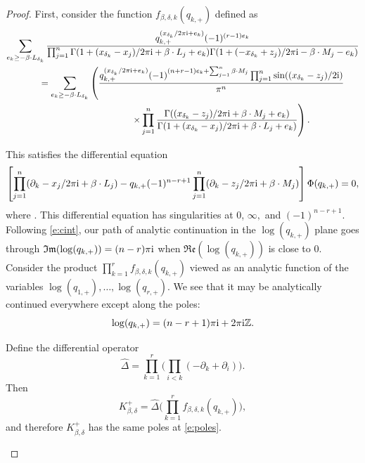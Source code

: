 \documentclass[pdftex]{sigma}
\numberwithin{equation}{section}
\newcommand{\ZZ}{\mathbb{Z}}
\newcommand{\MB}{M}
\newcommand{\LB}{L}
\newcommand{\z}{z}
\newcommand{\x}{x}
\begin{document}
\begin{proof}


First, consider the function $f_{\beta, \delta, k}(q_{k, +})$ defined as
\begin{gather*}
\sum_{e_k \geq - \beta \cdot \LB_{\delta_k}}
\frac{q_{k, +}^{( \x_{\delta_k}/2\pi {\rm i} + e_k)} (-1)^{(r-1)e_k}}{
\prod_{j=1}^n\Gamma(1+(\x_{\delta_k}-\x_j)/2 \pi {\rm i}+\beta\cdot \LB_j+e_k)\Gamma(1+(-\x_{\delta_k}+\z_j)/2 \pi {\rm i}-\beta\cdot \MB_j-e_k)} \\
\qquad{}=\sum_{e_k \geq - \beta \cdot \LB_{\delta_k}}
\left( \frac{q_{k, +}^{( \x_{\delta_k}/2\pi {\rm i} + e_k)}(-1)^{(n+r-1)e_k + \sum_{j=1}^n \beta \cdot M_j }\prod_{j=1}^n \sin((\x_{\delta_k}-\z_j)/2{\rm i})
 }{ \pi^n
} \right. \\
\qquad\quad\hphantom{=\sum_{e_k \geq - \beta \cdot \LB_{\delta_k}}}{} \left.\times \prod_{j=1}^n\frac{\Gamma((\x_{\delta_k}-\z_j)/2 \pi {\rm i}+\beta\cdot \MB_j+e_k)}{\Gamma(1+(\x_{\delta_k}-\x_j)/2 \pi {\rm i}+\beta\cdot \LB_j+e_k)}\right).
\end{gather*}

This satisfies the differential equation
\[
\left[\prod_{j=1}^n (\partial_k -x_j/2 \pi {\rm i} + \beta \cdot L_j) - q_{k, +}(-1)^{n-r+1}\prod_{j=1}^n (\partial_k -z_j/2 \pi {\rm i} + \beta \cdot M_j) \right] \Phi(q_{k,+}) = 0,
\]
where . This differential equation has singularities at $0$, $\infty,$ and $(-1)^{n-r+1}$. Follo\-wing \eqref{e:cint}, our path of analytic continuation in the $\log(q_{k,+})$ plane goes through $\mathfrak{Im}(\log(q_{k,+})) = (n-r)\pi {\rm i}$ when $\mathfrak{Re}(\log(q_{k,+}))$ is close to 0.
Consider the product
$
\prod_{k=1}^r   f_{\beta, \delta, k}(q_{k, +})$
viewed as an analytic function of the variables $\log(q_{1, +}),\allowbreak \dots, \log(q_{r, +})$. We see that it may be analytically continued everywhere except along the poles:
\begin{equation} \label{e:poles} \log(q_{k,+}) = (n-r+1)\pi {\rm i} + 2 \pi {\rm i} \ZZ.\end{equation}

Define the differential operator
\[
\hat \Delta = \prod_{k=1}^r \biggl( \prod_{i< k} (-\partial_k + \partial_i) \biggr).
\]
Then
\[
K^+_{\beta, \delta} = \hat \Delta \Biggl( \prod_{k=1}^r f_{\beta, \delta, k}(q_{k, +}) \Biggr),
\]
and therefore $ K^+_{\beta, \delta}$ has the same poles at \eqref{e:poles}.


 \begin{figure}[t]\centering
{} %


\end{figure}
\end{proof}
\end{document}
